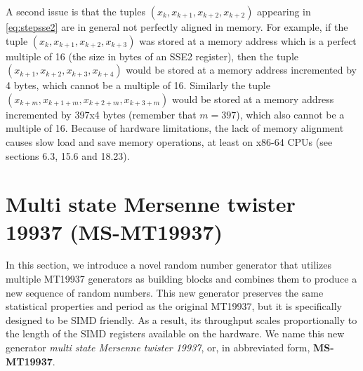 \documentclass[preprint,1p,times]{elsarticle}
\begin{document}
A second issue is that the tuples $(x_k, x_{k+1}, x_{k+2}, x_{k+2})$ appearing in \eqref{eq:stepsse2} are in general not perfectly aligned in memory. For example, if the tuple $(x_k, x_{k+1}, x_{k+2}, x_{k+3})$ was stored at a memory address which is a perfect multiple of 16 (the size in bytes of an SSE2 register), then the tuple $(x_{k+1}, x_{k+2}, x_{k+3}, x_{k+4})$ would be stored at a memory address incremented by 4 bytes, which cannot be a multiple of 16. Similarly the tuple $(x_{k+m}, x_{k+1+m}, x_{k+2+m}, x_{k+3+m})$ would be stored at a memory address incremented by 397x4 bytes (remember that $m=397$), which also cannot  be a multiple of 16. Because of hardware limitations, the lack of memory alignment causes slow load and save memory operations, at least on x86-64 CPUs (see \cite{intel} sections 6.3, 15.6 and 18.23).

\section{Multi state Mersenne twister 19937 (MS-MT19937)}
\label{sec:simdgen}
In this section, we introduce a novel random number generator that utilizes multiple MT19937 generators as building blocks and combines them to produce a new sequence of random numbers. This new generator preserves the same statistical properties and period as the original MT19937, but it is specifically designed to be SIMD friendly. As a result, its throughput scales proportionally to the length of the SIMD registers available on the hardware. We name this new generator \textit{multi state Mersenne twister 19937}, or, in abbreviated form, \textbf{MS-MT19937}.
\end{document}

